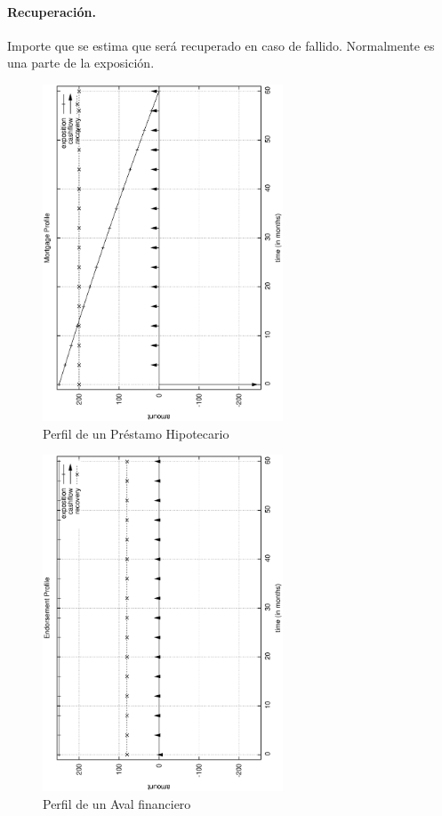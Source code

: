 \paragraph{Recuperaci\'on.} Importe que se estima que ser\'a recuperado en 
caso de fallido. Normalmente es una parte de la exposici\'on.


\begin{figure}[!hb]
\begin{center}
\includegraphics[height=10cm, angle=-90]{./images/mortgage.ps}
\caption{Perfil de un Pr\'estamo Hipotecario}
\label{mortgage}
\end{center}
\end{figure}


\begin{figure}[!hb]
\begin{center}
\includegraphics[height=10cm, angle=-90]{./images/endorsement.ps}
\caption{Perfil de un Aval financiero}
\label{endorsement}
\end{center}
\end{figure}

